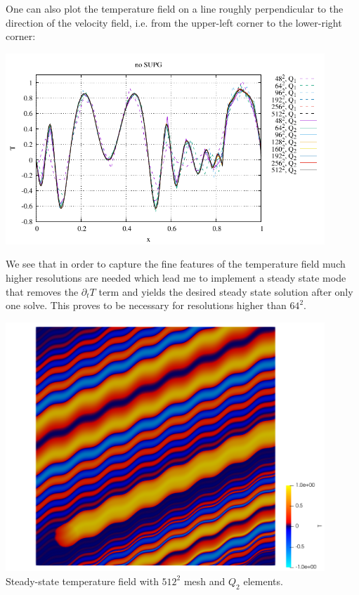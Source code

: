One can also plot the temperature field on a line roughly perpendicular to the 
direction of the velocity field, i.e. from the upper-left corner to 
the lower-right corner:
\begin{center}
\includegraphics[width=12cm]{python_codes/fieldstone_43/results/experiment9/diagonal.pdf}
\end{center}
We see that in order to capture the fine features of the temperature field 
much higher resolutions are needed which lead me to implement a steady state mode
that removes the $\partial_tT$ term and yields the desired steady state solution 
after only one solve. This proves to be necessary for resolutions higher than $64^2$.

\begin{center}
\includegraphics[width=12cm]{python_codes/fieldstone_43/results/experiment9/512_Q2/T.png}\\
{\captionfont Steady-state temperature field with $512^2$ mesh and $Q_2$ elements.}
\end{center}


